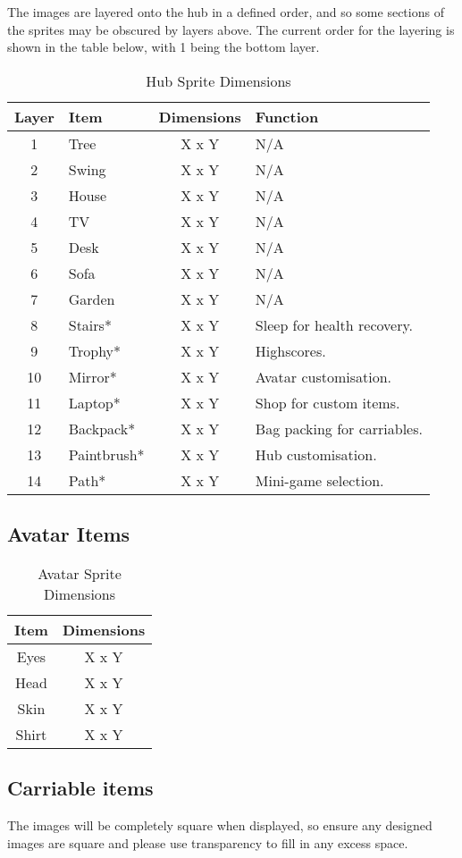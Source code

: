 \documentclass[a4paper,12pt]{article}
\begin{document}
The images are layered onto the hub in a defined order, and so some sections of the sprites may be obscured by layers above. The current order for the layering is shown in the table below, with 1 being the bottom layer.

\begin{table}[H]
	\centering
	\begin{tabular}{|c|l|c|l|}
		\hline
		Layer &	Item  		& Dimensions	& Function \\ \hline
		1 &		Tree		& X x Y			& N/A \\
		2 &		Swing		& X x Y			& N/A \\
		3 &		House		& X x Y			& N/A \\
		4 &		TV			& X x Y 		& N/A \\
		5 &		Desk		& X x Y			& N/A \\
		6 &		Sofa		& X x Y			& N/A \\
		7 &		Garden		& X x Y			& N/A \\
		8 &		Stairs*		& X x Y			& Sleep for health recovery. \\
		9 &		Trophy*		& X x Y			& Highscores. \\
		10 &	Mirror*		& X x Y			& Avatar customisation. \\
		11 &	Laptop*		& X x Y			& Shop for custom items. \\
		12 &	Backpack*	& X x Y			& Bag packing for carriables. \\
		13 &	Paintbrush*	& X x Y			& Hub customisation. \\
		14 &	Path*		& X x Y			& Mini-game selection. \\ \hline
	\end{tabular}
	\caption{Hub Sprite Dimensions}
	\label{tab:hub_dimensions}
\end{table}

\subsection{Avatar Items}

\begin{table}[H]
	\centering
	\begin{tabular}{|c|c|}
		\hline
		Item  & Dimensions \\ \hline
		Eyes  & X x Y      \\
		Head  & X x Y      \\
		Skin  & X x Y      \\
		Shirt & X x Y      \\ \hline
	\end{tabular}
	\caption{Avatar Sprite Dimensions}
	\label{tab:avatar_dimensions}
\end{table}

\subsection{Carriable items}

The images will be completely square when displayed, so ensure any designed images are square and please use transparency to fill in any excess space.
\end{document}
